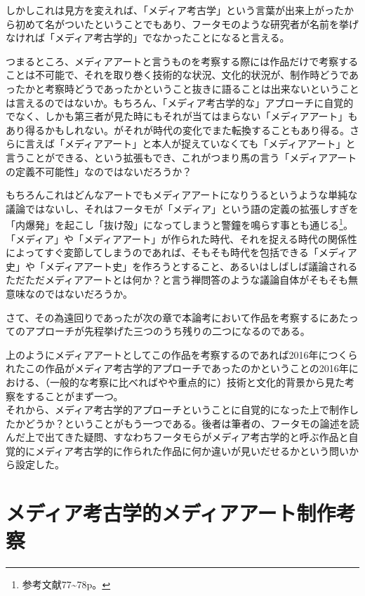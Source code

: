 \documentclass[a4paper,report]{jsbook}
\begin{document}
しかしこれは見方を変えれば、「メディア考古学」という言葉が出来上がったから初めて名がついたということでもあり、フータモのような研究者が名前を挙げなければ「メディア考古学的」でなかったことになると言える。

つまるところ、メディアアートと言うものを考察する際には作品だけで考察することは不可能で、それを取り巻く技術的な状況、文化的状況が、制作時どうであったかと考察時どうであったかということ抜きに語ることは出来ないということは言えるのではないか。もちろん、「メディア考古学的な」アプローチに自覚的でなく、しかも第三者が見た時にもそれが当てはまらない「メディアアート」もあり得るかもしれない。がそれが時代の変化でまた転換することもあり得る。さらに言えば「メディアアート」と本人が捉えていなくても「メディアアート」と言うことができる、という拡張もでき、これがつまり馬の言う「メディアアートの定義不可能性」なのではないだろうか？

もちろんこれはどんなアートでもメディアアートになりうるというような単純な議論ではないし、それはフータモが「メディア」という語の定義の拡張しすぎを「内爆発」を起こし「抜け殻」になってしまうと警鐘を鳴らす事とも通じる\footnote{参考文献\autocite{huhtamo:mediaarcheology}77\textasciitilde{}78p。}。「メディア」や「メディアアート」が作られた時代、それを捉える時代の関係性によってすぐ変節してしまうのであれば、そもそも時代を包括できる「メディア史」や「メディアアート史」を作ろうとすること、あるいはしばしば議論されるただただメディアアートとは何か？と言う禅問答のような議論自体がそもそも無意味なのではないだろうか。

さて、その為遠回りであったが次の章で本論考において作品を考察するにあたってのアプローチが先程挙げた三つのうち残りの二つになるのである。

上のようにメディアアートとしてこの作品を考察するのであれば2016年につくられたこの作品がメディア考古学的アプローチであったのかということの2016年における、（一般的な考察に比べればやや重点的に）技術と文化的背景から見た考察をすることがまず一つ。\\
それから、メディア考古学的アプローチということに自覚的になった上で制作したかどうか？ということがもう一つである。後者は筆者の、フータモの論述を読んだ上で出てきた疑問、すなわちフータモらがメディア考古学的と呼ぶ作品と自覚的にメディア考古学的に作られた作品に何か違いが見いだせるかという問いから設定した。

\chapter{メディア考古学的メディアアート制作考察}\label{ux30e1ux30c7ux30a3ux30a2ux8003ux53e4ux5b66ux7684ux30e1ux30c7ux30a3ux30a2ux30a2ux30fcux30c8ux5236ux4f5cux8003ux5bdf}
\end{document}
